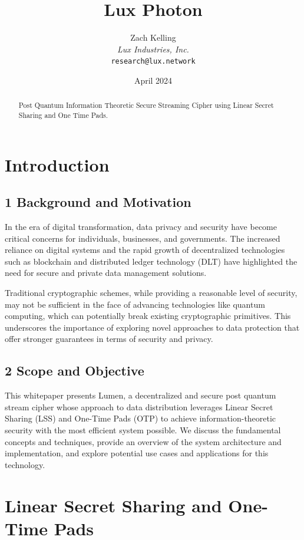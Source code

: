 \documentclass[11pt]{article}
\title{Lux Photon}
\author{Zach Kelling\\\textit{Lux Industries, Inc.}\\\texttt{research@lux.network}}
\date{April 2024}
\begin{document}
\luxcoverpage

\begin{abstract}
Post Quantum Information Theoretic Secure Streaming Cipher using Linear Secret Sharing and One Time Pads.
\end{abstract}

\tableofcontents
\newpage


\section{Introduction}

\subsection{1 Background and Motivation}

In the era of digital transformation, data privacy and security have become critical concerns for individuals, businesses, and governments. The increased reliance on digital systems and the rapid growth of decentralized technologies such as blockchain and distributed ledger technology (DLT) have highlighted the need for secure and private data management solutions.


Traditional cryptographic schemes, while providing a reasonable level of security, may not be sufficient in the face of advancing technologies like quantum computing, which can potentially break existing cryptographic primitives. This underscores the importance of exploring novel approaches to data protection that offer stronger guarantees in terms of security and privacy.


\subsection{2 Scope and Objective}

This whitepaper presents Lumen, a decentralized and secure post quantum stream cipher whose approach to data distribution leverages Linear Secret Sharing (LSS) and One-Time Pads (OTP) to achieve information-theoretic security with the most efficient system possible. We discuss the fundamental concepts and techniques, provide an overview of the system architecture and implementation, and explore potential use cases and applications for this technology.


\section{Linear Secret Sharing and One-Time Pads}
\end{document}
